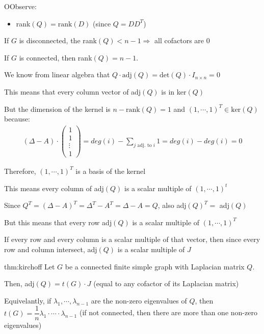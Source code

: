 \par\bigskip
\begin{prf}
  OObserve:\par
  \begin{itemize}
    \item rank$(Q) = \text{rank}(D)$ (since $Q = DD^T$)
  \end{itemize}
  \par\bigskip
  \noindent If $G$ is disconnected, the rank$(Q)<n-1\Rightarrow$ all cofactors are 0
  \par\bigskip
  \noindent If $G$ is connected, then rank$(Q) = n-1$.
  \par\bigskip
  \noindent We know from linear algebra that $Q\cdot\text{adj}(Q) = \text{det}(Q)\cdot I_{n\times n} = 0$
  \par\bigskip
  \noindent This means that every column vector of adj$(Q)$ is in ker$(Q)$
  \par\bigskip
  \noindent But the dimension of the kernel is $n-\text{rank}(Q) = 1$ and $(1,\cdots,1)^T\in\text{ker}(Q)$ because:
  \begin{equation*}
    \begin{gathered}
      (\Delta-A)\cdot\begin{pmatrix}1\\1\\\vdots\\1\end{pmatrix} = deg(i)-\sum_{j\text{ adj. to } i}1 = deg(i)-deg(i) = 0
    \end{gathered}
  \end{equation*}
  \par\bigskip
  \noindent Therefore, $(1,\cdots,1)^T$ is a basis of the kernel
  \par\bigskip
  \noindent This means every column of adj$(Q)$ is a scalar multiple of $(1,\cdots,1)^t$
  \par\bigskip
  \noindent Since $Q^T = (\Delta-A)^T = \Delta^T-A^T = \Delta -A = Q$, also adj$(Q)^T = $ adj$(Q)$
  \par\bigskip
  \noindent But this means that every row adj$(Q)$ is a scalar multiple of $(1,\cdots,1)^T$
  \par\bigskip
  \noindent If every row and every column is a scalar multiple of that vector, then since every row and column intersect, adj$(Q)$ is a scalar multiple of $J$ 
\end{prf}
\par\bigskip
\begin{theo}{thm:kirchoff}
  Let $G$ be a connected finite simple graph with Laplacian matrix $Q$.
  \par\bigskip
  \noindent Then, adj$(Q) = t(G)\cdot J$ (equal to any cofactor of its Laplacian matrix)
  \par\bigskip
  \noindent Equivelantly, if $\lambda_1,\cdots,\lambda_{n-1}$ are the non-zero eigenvalues of $Q$, then $t(G) = \dfrac{1}{n}\lambda_1\cdot\cdots\cdot\lambda_{n-1}$ (if not connected, then there are more than one non-zero eigenvalues)
\end{theo}
